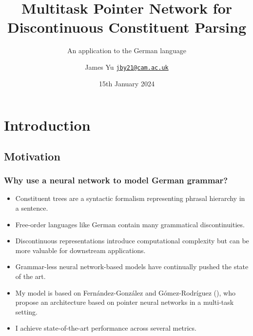\documentclass[8pt]{beamer}
\date[15/01/24]{15th January 2024}
\title[Discontinuous Constituent Parsing]{Multitask Pointer Network for Discontinuous Constituent Parsing}
\subtitle[An application to German]{An application to the German language}
\author[J. Yu]{James Yu \newline \href{mailto:jby21@cam.ac.uk}{\texttt{jby21@cam.ac.uk}}}
\institute[Cambridge]{Faculty of Economics \\ University of Cambridge}
\theoremstyle{definition}
\theoremstyle{plain}
\theoremstyle{definition}
\theoremstyle{remark}
\numberwithin{equation}{section}
\numberwithin{figure}{section}
\numberwithin{table}{section}
\begin{document}
\begin{frame}
    \titlepage
\end{frame}

\section{Introduction}
\subsection{Motivation}
\begin{frame}
    \frametitle{Why use a neural network to model German grammar?}
    \begin{itemize}[<+->]
        \item Constituent trees are a syntactic formalism representing phrasal hierarchy in a sentence.

        \item Free-order languages like German contain many grammatical discontinuities.

        \item Discontinuous representations introduce computational complexity but can be more valuable for downstream applications.
        
        \item Grammar-less neural network-based models have continually pushed the state of the art.

        \item My model is based on Fernández-González and Gómez-Rodríguez (\citeyear{fernandez2022multitask2}), who propose an architecture based on pointer neural networks in a multi-task setting.

        \item I achieve state-of-the-art performance across several metrics.
    \end{itemize}
\end{frame}
\end{document}
